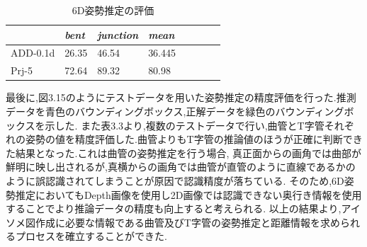 \begin{table}[htbp]
\centering
\caption{6D姿勢推定の評価}
\begin{tabular}{llllllll}
\hline
\textit{\textbf{}} & \textit{bent} & \textit{junction} & \textit{mean} \\ \hline
ADD-0.1d        & 26.35 & 46.54 & 36.445 \\
Prj-5				&	72.64	 &	89.32	& 80.98		\\
\end{tabular}%
\end{table}
最後に,図3.15のようにテストデータを用いた姿勢推定の精度評価を行った.推測データを青色のバウンディングボックス,正解データを緑色のバウンディングボックスを示した.
また表3.3より,複数のテストデータで行い,曲管とT字管それぞれの姿勢の値を精度評価した.曲管よりもT字管の推論値のほうが正確に判断できた結果となった.これは曲管の姿勢推定を行う場合,
真正面からの画角では曲部が鮮明に映し出されるが,真横からの画角では曲管が直管のように直線であるかのように誤認識されてしまうことが原因で認識精度が落ちている.
そのため,6D姿勢推定においてもDepth画像を使用し2D画像では認識できない奥行き情報を使用することでより推論データの精度も向上すると考えられる.
以上の結果より,アイソメ図作成に必要な情報である曲管及びT字管の姿勢推定と距離情報を求められるプロセスを確立することができた.

